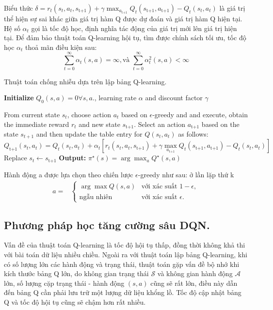\documentclass{uetgraduation}
\begin{document}
Biểu thức $\delta = r_t(s_t, a_t, s_\text{t+1}) + \gamma \max_{a_\text{t+1}} Q_t (s_\text{t+1}, a_\text{t+1}) - Q_t (s_t, a_t)$ là giá trị thể hiện sự sai khác
giữa giá trị hàm Q được dự đoán và giá trị hàm Q hiện tại. Hệ số $\alpha_t$ gọi là tốc độ học, định nghĩa tác động của giá trị mới lên giá trị hiện tại. Để đảm bảo thuật toán
Q-learning hội tụ, tìm được chính sách tối ưu, tốc độ học $\alpha_t$ thoả mãn điều kiện sau:
\[
\sum_{t=0}^{\infty} \alpha_t (s, a) = \infty, \text{và } \sum_{t=0}^{\infty} \alpha_t^2 (s, a) < \infty
\]
\begin{algorithm}
    \caption{Thuật toán chống nhiễu dựa trên lập bảng Q-learning.}\label{alg:qlearning}
    \begin{algorithmic}[1]
    \State \textbf{Initialize } $Q_0(s,a) = 0 \forall s,a.$, learning rate $\alpha$ and discount factor $\gamma$
    
        \State From current state $s_t$, choose action $a_t$ based on $\epsilon$-greedy and and execute, obtain the immediate reward
        $r_t$ and new state $s_\text{t+1}$. Select an action $a_\text{t+1}$ based on the state $s_{t+1}$ and then update the table entry for $Q(s_t, a_t)$
        as follows:
        \[
        Q_\text{t+1} (s_t, a_t) = Q_t (s_t, a_t) + \alpha_t [r_t(s_t, a_t, s_\text{t+1}) + \gamma \max_{a_\text{t+1}} Q_t (s_\text{t+1}, a_\text{t+1}) - Q_t (s_t, a_t) ]
        \]
        \State Replace $s_t \leftarrow s_\text{t+1}$
    \EndFor
    \State \textbf{Output: } $\pi^\star (s) = \arg \max_{a} Q^\star (s, a)$
\end{algorithmic}
\end{algorithm}

Hành động a được lựa chọn theo chiến lược $\epsilon$-greedy như sau: ở lần lặp thứ k
\begin{align*}
    a =& \begin{cases}
        \arg \max Q(s, a) & \text{với xác suất } 1 - \epsilon, \\ 
        \text{ngẫu nhiên} & \text{với xác suất } \epsilon.
    \end{cases}
\end{align*}

\subsection{Phương pháp học tăng cường sâu DQN.}
Vấn đề của thuật toán Q-learning là tốc độ hội tụ thấp, đồng thời không khả thi với bài toán dữ liệu nhiều chiều. Ngoài ra với thuật toán lập bảng Q-learning,
khi có số lượng lớn các hành động và trạng thái, thuật toán gặp vấn đề bộ nhớ khi kích thước bảng Q lớn, do không gian trạng thái $\mathcal{S}$ và không gian hành động $\mathcal{A}$
lớn, số lượng cặp trạng thái - hành động $(s,a)$ cũng sẽ rất lớn, điều này dẫn đến bảng Q cần phải lưu trữ một lượng dữ liệu khổng lồ. Tốc độ cập nhật bảng Q và tốc độ hội tụ cũng sẽ
chậm hơn rất nhiều.
\end{document}
